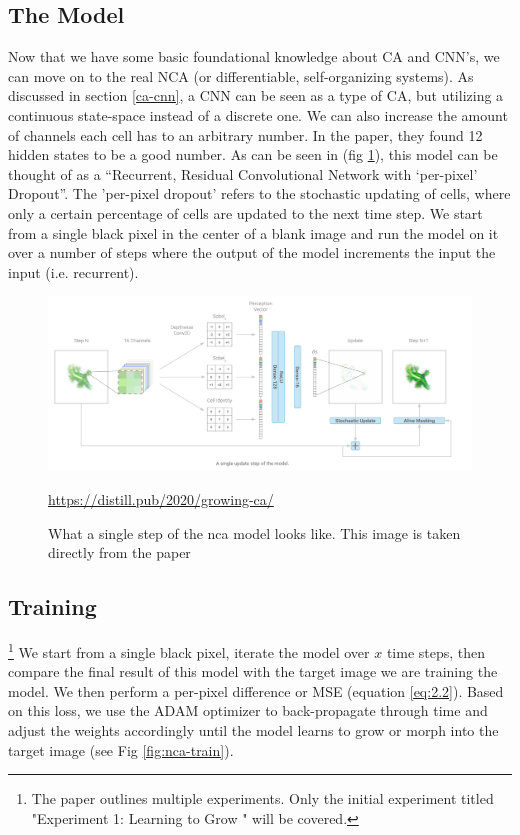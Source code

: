 \subsection{The Model}
Now that we have some basic foundational knowledge about CA and CNN's, we can move on to the real NCA (or differentiable, self-organizing systems). As discussed in section \ref{ca-cnn}, a CNN can be seen as a type of CA, but utilizing a continuous state-space instead of a discrete one. We can also increase the amount of channels each cell has to an arbitrary number. In the paper, they found 12 hidden states to be a good number. As can be seen in (fig \ref{fig:nca}), this model can be thought of as a “Recurrent, Residual Convolutional Network with ‘per-pixel’ Dropout”. The 'per-pixel dropout' refers to the stochastic updating of cells, where only a certain percentage of cells are updated to the next time step. We start from a single black pixel in the center of a blank image and run the model on it over a number of steps where the output of the model increments the input the input (i.e. recurrent).
\begin{figure}[h]
	\includegraphics[width=1\textwidth]{../Figures/growing_nca.png}
	\centering
	\caption[NCA]{What a single step of the nca model looks like. This image is taken directly from the  paper \cite{growing_nca}} 
	\label{fig:nca}
	\url{https://distill.pub/2020/growing-ca/}
\end{figure}

\subsection{Training} \footnote{The paper outlines multiple experiments. Only the initial experiment titled "Experiment 1: Learning to Grow " will be covered.}
We start from a single black pixel, iterate the model over $x$ time steps, then compare the final result of this model with the target image we are training the model. We then perform a per-pixel difference or MSE (equation \ref{eq:2.2}). Based on this loss, we use the ADAM optimizer to back-propagate through time and adjust the weights accordingly until the model learns to grow or morph into the target image (see Fig \ref{fig:nca-train}).
	
